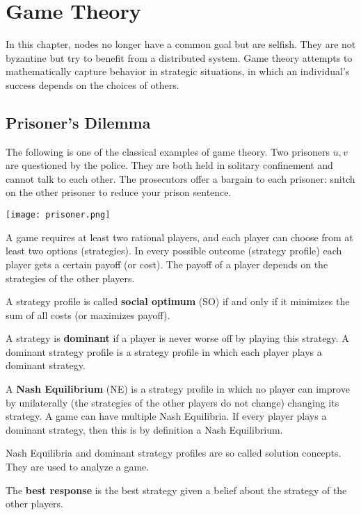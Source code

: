 \section{Game Theory}

In this chapter, nodes no longer have a common goal but are selfish. They are not byzantine but try to benefit from a distributed system. Game theory attempts to mathematically capture behavior in strategic situations, in which an individual's success depends on the choices of others.

\subsection{Prisoner's Dilemma}

The following is one of the classical examples of game theory. Two prisoners $u, v$ are questioned by the police. They are both held in solitary confinement and cannot talk to each other. The prosecutors offer a bargain to each prisoner: snitch on the other prisoner to reduce your prison sentence.
\begin{center}
	\texttt{[image: prisoner.png]}
\end{center}

A game requires at least two rational players, and each player can choose from at least two options (strategies). In every possible outcome (strategy profile) each player gets a certain payoff (or cost). The payoff of a player depends on the strategies of the other players. \medskip

A strategy profile is called \textbf{social optimum} (SO) if and only if it minimizes the sum of all costs (or maximizes payoff). \medskip

A strategy is \textbf{dominant} if a player is never worse off by playing this strategy. A dominant strategy profile is a strategy profile in which each player plays a dominant strategy. \medskip

A \textbf{Nash Equilibrium} (NE) is a strategy profile in which no player can improve by unilaterally (the strategies of the other players do not change) changing its strategy. A game can have multiple Nash Equilibria. If every player plays a dominant strategy, then this is by definition a Nash Equilibrium. \medskip

Nash Equilibria and dominant strategy profiles are so called solution concepts. They are used to analyze a game. \medskip

The \textbf{best response} is the best strategy given a belief about the strategy of the other players.


